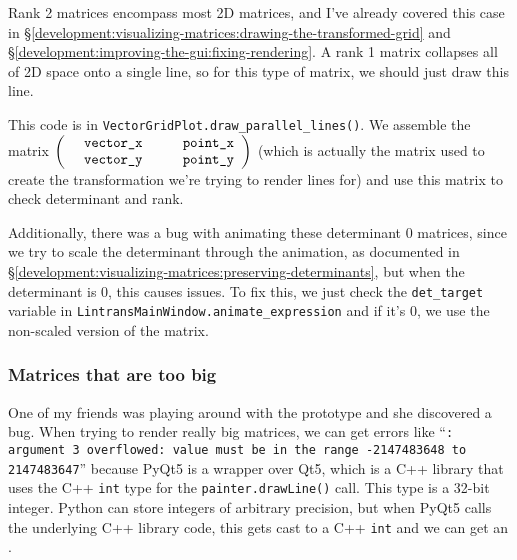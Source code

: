 \documentclass[../development.tex]{subfiles}
\begin{document}
Rank 2 matrices encompass most 2D matrices, and I've already covered this case in \S\ref{development:visualizing-matrices:drawing-the-transformed-grid} and \S\ref{development:improving-the-gui:fixing-rendering}. A rank 1 matrix collapses all of 2D space onto a single line, so for this type of matrix, we should just draw this line.

This code is in \texttt{VectorGridPlot.draw\_parallel\_lines()}. We assemble the matrix $\begin{pmatrix}\text{\texttt{vector\_x}} & \text{\texttt{point\_x}}\\ \text{\texttt{vector\_y}} & \text{\texttt{point\_y}}\end{pmatrix}$ (which is actually the matrix used to create the transformation we're trying to render lines for) and use this matrix to check determinant and rank.


Additionally, there was a bug with animating these determinant 0 matrices, since we try to scale the determinant through the animation, as documented in \S\ref{development:visualizing-matrices:preserving-determinants}, but when the determinant is 0, this causes issues. To fix this, we just check the \texttt{det\_target} variable in \texttt{LintransMainWindow.animate\_expression} and if it's 0, we use the non-scaled version of the matrix.


\subsubsection{Matrices that are too big\label{development:improving-the-gui:matrices-that-are-too-big}}

One of my friends was playing around with the prototype and she discovered a bug. When trying to render really big matrices, we can get errors like \enquote{\texttt{: argument 3 overflowed: value must be in the range -2147483648 to 2147483647}} because PyQt5 is a wrapper over Qt5, which is a C++ library that uses the C++ \texttt{int} type for the \texttt{painter.drawLine()} call. This type is a 32-bit integer. Python can store integers of arbitrary precision, but when PyQt5 calls the underlying C++ library code, this gets cast to a C++ \texttt{int} and we can get an .
\end{document}

